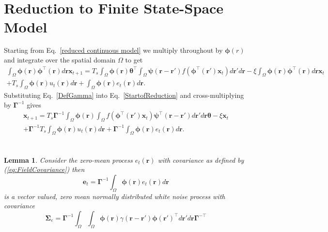 \documentclass[12pt]{iopart}		%
\begin{document}
\section{Reduction to Finite State-Space Model}\label{Simplifying Decomposition}
Starting from Eq.~\ref{reduced continuous model} we multiply throughout by $\boldsymbol{\phi}(r)$ and integrate over the spatial domain $\Omega$ to get
\begin{eqnarray}\label{StartofReduction}
	\int_\Omega  {\boldsymbol{\phi} \left(\mathbf{r}\right)\boldsymbol{\phi}^{\top}\left(\mathbf{r}\right) d\mathbf{r}} \mathbf{x}_{t+1} = T_s \int_\Omega  {\boldsymbol{\phi} (\mathbf{r}) \boldsymbol{\theta}^{\top} \int_\Omega  {\boldsymbol{\psi}  \left(\mathbf{r}-\mathbf{r}'\right) f\left(\boldsymbol{\phi}^{\top}\left(\mathbf{r}'\right) \mathbf{x}_t \right)d\mathbf{r}'}d\mathbf{r}} - \xi\int_\Omega {\boldsymbol{\phi}(\mathbf{r})\boldsymbol{\phi}^{\top}(\mathbf{r})d\mathbf{r}} \mathbf{x}_t \\
	+ T_s \int_\Omega{\boldsymbol{\phi} \left(\mathbf{r}\right) u_t\left(\mathbf{r}\right)d\mathbf{r}} + \int_\Omega{\boldsymbol{\phi} \left(\mathbf{r}\right) e_t\left(\mathbf{r}\right)d\mathbf{r}}.
\end{eqnarray}
Substituting Eq.~\ref{DefGamma} into Eq.~\ref{StartofReduction} and cross-multiplying by $\boldsymbol{\Gamma}^{-1}$ gives 
\begin{eqnarray}\label{Homogeneous SS Model}
	\mathbf{x}_{t+1} = T_s\boldsymbol{\Gamma}^{ - 1}\int_\Omega {\boldsymbol{\phi}\left(\mathbf{r}\right) \int_\Omega {f\left(\boldsymbol{\phi}^{\top}\left(\mathbf{r}'\right)\mathbf{x}_t\right) \boldsymbol{\psi}^{\top} \left(\mathbf{r}-\mathbf{r}'\right)d\mathbf{r}'} d\mathbf{r}} \boldsymbol{\theta} - \xi \mathbf{x}_t \\
	+ \boldsymbol{\Gamma}^{-1}T_s \int_\Omega{\boldsymbol{\phi} \left(\mathbf{r}\right) u_t\left(\mathbf{r}\right)d\mathbf{r}} + \boldsymbol{\Gamma}^{-1} \int_\Omega{\boldsymbol{\phi}\left(\mathbf{r}\right)e_t\left(\mathbf{r}\right)d\mathbf{r}}.
\end{eqnarray}
\section{}\label{ColoredNoise}
\newtheorem{lemma}{Lemma}
\begin{lemma}
Consider the zero-mean process $e_t\left(\mathbf r\right)$ with covariance as defined by (\ref{eq:FieldCovariance}) then
\begin{equation}
 \mathbf e_t=\boldsymbol{\Gamma}^{-1}\int_\Omega  {\boldsymbol{\phi} ( \mathbf{r} )e_t( \mathbf{r} )d\mathbf{r}}
\label{eq:AppendixWt}
\end{equation}
is a vector valued, zero mean normally distributed white noise process with covariance
\begin{equation}
\boldsymbol\Sigma_e =\mathbf{\Gamma}^{-1}\int_{\Omega}\int_{\Omega}\boldsymbol{\phi}\left(\mathbf r\right) \gamma\left(\mathbf r- \mathbf r' \right)\boldsymbol{\phi}\left(\mathbf r'\right)^{\top}d\mathbf r' d\mathbf r\mathbf{\Gamma}^{- \top} 
\end{equation}
\label{lemma:FieldCovariance}
\end{lemma}
\end{document}
